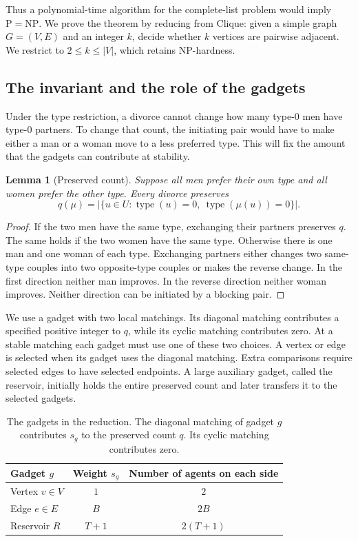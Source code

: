 \documentclass[11pt,letterpaper]{article}
\newtheorem{lemma}{Lemma}
\theoremstyle{definition}
\begin{document}
Thus a polynomial-time algorithm for the complete-list problem would imply $\mathrm{P}=\mathrm{NP}$. We prove the theorem by reducing from Clique: given a simple graph $G=(V,E)$ and an integer $k$, decide whether $k$ vertices are pairwise adjacent. We restrict to $2\le k\le |V|$, which retains NP-hardness.

\subsection{The invariant and the role of the gadgets}

Under the type restriction, a divorce cannot change how many type-0 men have type-0 partners. To change that count, the initiating pair would have to make either a man or a woman move to a less preferred type. This will fix the amount that the gadgets can contribute at stability.

\begin{lemma}[Preserved count]
Suppose all men prefer their own type and all women prefer the other type. Every divorce preserves
\begin{equation}\tag{3}
q(\mu)=\bigl|\{u\in U:\operatorname{type}(u)=0,\ \operatorname{type}(\mu(u))=0\}\bigr|.
\end{equation}
\end{lemma}
\begin{proof}
If the two men have the same type, exchanging their partners preserves $q$. The same holds if the two women have the same type. Otherwise there is one man and one woman of each type. Exchanging partners either changes two same-type couples into two opposite-type couples or makes the reverse change. In the first direction neither man improves. In the reverse direction neither woman improves. Neither direction can be initiated by a blocking pair.
\end{proof}

We use a gadget with two local matchings. Its diagonal matching contributes a specified positive integer to $q$, while its cyclic matching contributes zero. At a stable matching each gadget must use one of these two choices. A vertex or edge is selected when its gadget uses the diagonal matching. Extra comparisons require selected edges to have selected endpoints. A large auxiliary gadget, called the reservoir, initially holds the entire preserved count and later transfers it to the selected gadgets.

\begin{table}[htbp]
\centering
\begin{tabular}{@{}lcc@{}}
\toprule
Gadget $g$ & Weight $s_g$ & Number of agents on each side\\
\midrule
Vertex $v\in V$ & $1$ & $2$\\
Edge $e\in E$ & $B$ & $2B$\\
Reservoir $R$ & $T+1$ & $2(T+1)$\\
\bottomrule
\end{tabular}
\caption{The gadgets in the reduction. The diagonal matching of gadget $g$ contributes $s_g$ to the preserved count $q$. Its cyclic matching contributes zero.}
\end{table}
\end{document}
